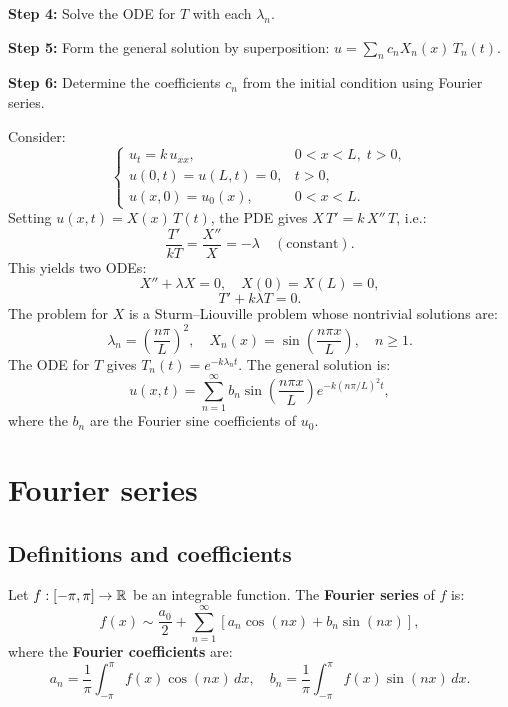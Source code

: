 \textbf{Step 4:} Solve the ODE for $T$ with each $\lambda_n$.

\textbf{Step 5:} Form the general solution by superposition:
$u = \sum_n c_n X_n(x)\, T_n(t)$.

\textbf{Step 6:} Determine the coefficients $c_n$ from the initial
condition using Fourier series.

\begin{example}
Consider:
\[
    \begin{cases}
        u_t = k\, u_{xx}, & 0 < x < L,\; t > 0,\\
        u(0,t) = u(L,t) = 0, & t > 0,\\
        u(x,0) = u_0(x), & 0 < x < L.
    \end{cases}
\]
Setting $u(x,t) = X(x)\, T(t)$, the PDE gives $X\, T' = k\, X''\, T$, i.e.:
\[
    \frac{T'}{kT} = \frac{X''}{X} = -\lambda \quad (\text{constant}).
\]
This yields two ODEs:
\[
    X'' + \lambda X = 0, \quad X(0) = X(L) = 0,
\]
\[
    T' + k\lambda T = 0.
\]
The problem for $X$ is a Sturm--Liouville problem whose nontrivial
solutions are:
\[
    \lambda_n = \left(\frac{n\pi}{L}\right)^2, \quad
    X_n(x) = \sin\!\left(\frac{n\pi x}{L}\right), \quad n \geq 1.
\]
The ODE for $T$ gives $T_n(t) = e^{-k\lambda_n t}$. The general solution is:
\[
    u(x,t) = \sum_{n=1}^{\infty} b_n \sin\!\left(\frac{n\pi x}{L}\right)
    e^{-k(n\pi/L)^2 t},
\]
where the $b_n$ are the Fourier sine coefficients of $u_0$.
\end{example}

\section{Fourier series}

\subsection{Definitions and coefficients}

\begin{definition}
Let $f : [-\pi, \pi] \to \mathbb{R}$ be an integrable function. The \textbf{Fourier
series} of $f$ is:
\begin{equation}\label{eq:fourier_series}
    f(x) \sim \frac{a_0}{2} + \sum_{n=1}^{\infty}
    \left[a_n \cos(nx) + b_n \sin(nx)\right],
\end{equation}
where the \textbf{Fourier coefficients} are:
\begin{equation}\label{eq:fourier_coefficients}
    a_n = \frac{1}{\pi}\int_{-\pi}^{\pi} f(x)\cos(nx)\, dx, \quad
    b_n = \frac{1}{\pi}\int_{-\pi}^{\pi} f(x)\sin(nx)\, dx.
\end{equation}
\end{definition}

